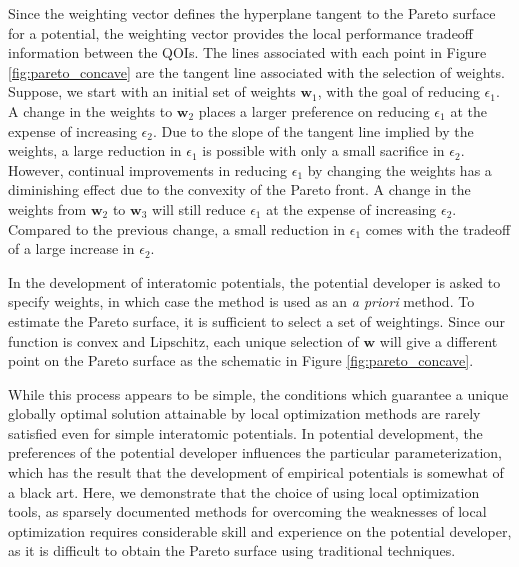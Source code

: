Since the weighting vector defines the hyperplane tangent to the Pareto surface for a potential, the weighting vector provides the local performance tradeoff information between the QOIs.  The lines associated with each point in Figure \ref{fig:pareto_concave} are the tangent line associated with the selection of weights.  Suppose, we start with an initial set of weights $\bm{w}_1$, with the goal of reducing $\epsilon_1$.  A change in the weights to $\bm{w}_2$ places a larger preference on reducing $\epsilon_1$ at the expense of increasing $\epsilon_2$.  Due to the slope of the tangent line implied by the weights, a large reduction in $\epsilon_1$ is possible with only a small sacrifice in $\epsilon_2$.  However, continual improvements in reducing $\epsilon_1$ by changing the weights has a diminishing effect due to the convexity of the Pareto front.  A change in the weights from $\bm{w}_2$ to $\bm{w}_3$ will still reduce $\epsilon_1$ at the expense of increasing $\epsilon_2$.  Compared to the previous change, a small reduction in $\epsilon_1$ comes with the tradeoff of a large increase in $\epsilon_2$.

In the development of interatomic potentials, the potential developer is asked to specify weights, in which case the method is used as an \emph{a priori} method.
To estimate the Pareto surface, it is sufficient to select a set of weightings.  Since our function is convex and Lipschitz, each unique selection of $\bm{w}$ will give a different point on the Pareto surface as the schematic in Figure \ref{fig:pareto_concave}.

While this process appears to be simple, the conditions which guarantee a unique globally optimal solution attainable by local optimization methods are rarely satisfied even for simple interatomic potentials.  In potential development, the preferences of the potential developer influences the particular parameterization, which has the result that the development of empirical potentials is somewhat of a black art.  Here, we demonstrate that the choice of using local optimization tools, as sparsely documented methods for overcoming the weaknesses of local optimization requires considerable skill and experience on the potential developer, as it is difficult to obtain the Pareto surface using traditional techniques.

